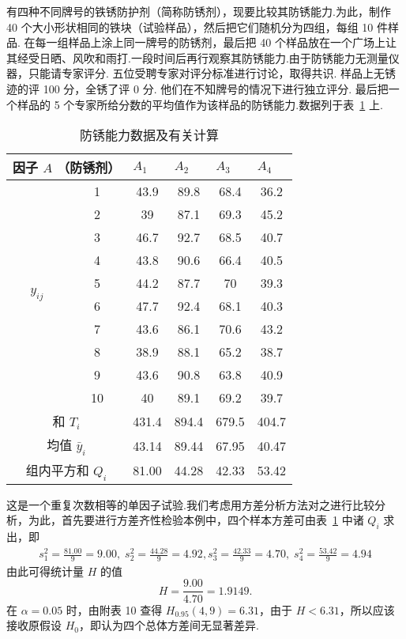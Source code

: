 \begin{example}
  有四种不同牌号的铁锈防护剂（简称防锈剂），现要比较其防锈能力.为此，制作 40 个大小形状相同的铁块（试验样品），然后把它们随机分为四组，每组 10 件样品. 在每一组样品上涂上同一牌号的防锈剂，最后把 40 个样品放在一个广场上让其经受日晒、风吹和雨打.一段时间后再行观察其防锈能力.由于防锈能力无测量仪器，只能请专家评分. 五位受聘专家对评分标准进行讨论，取得共识. 样品上无锈迹的评 100 分，全锈了评 0 分. 他们在不知牌号的情况下进行独立评分. 最后把一个样品的 5 个专家所给分数的平均值作为该样品的防锈能力.数据列于表~\ref{tab:8.3.1} 上.
\begin{table}[htbp]
  \centering
  \caption{防锈能力数据及有关计算}
    \begin{tabular}{c|c|cccc}
    \toprule
    \multicolumn{2}{c|}{因子 $A$ （防锈剂）} & \multicolumn{1}{l}{$A_1$} & \multicolumn{1}{l}{$A_2$} & \multicolumn{1}{l}{$A_3$} & \multicolumn{1}{l}{$A_4$} \\
    \midrule
    \multirow{10}[2]{*}{$y_{ij}$} &1 & 43.9  & 89.8  & 68.4  & 36.2 \\
          & 2 & 39    & 87.1  & 69.3  & 45.2 \\
          & 3 & 46.7  & 92.7  & 68.5  & 40.7 \\
          & 4 & 43.8  & 90.6  & 66.4  & 40.5 \\
          & 5 & 44.2  & 87.7  & 70    & 39.3 \\
          & 6 & 47.7  & 92.4  & 68.1  & 40.3 \\
          & 7 & 43.6  & 86.1  & 70.6  & 43.2 \\
          & 8 & 38.9  & 88.1  & 65.2  & 38.7 \\
          & 9 & 43.6  & 90.8  & 63.8  & 40.9 \\
          & 10 & 40    & 89.1  & 69.2  & 39.7 \\
    \midrule
    \multicolumn{2}{c|}{和 $T_i$} & 431.4 & 894.4 & 679.5 & 404.7 \\
    \multicolumn{2}{c|}{均值 $\bar{y}_i$} & 43.14 & 89.44 & 67.95 & 40.47 \\
    \multicolumn{2}{c|}{组内平方和 $Q_i$} & 81.00    & 44.28 & 42.33 & 53.42 \\
    \bottomrule
    \end{tabular}%
  \label{tab:8.3.1}%
\end{table}%
这是一个重复次数相等的单因子试验.我们考虑用方差分析方法对之进行比较分析，为此，首先要进行方差齐性检验本例中，四个样本方差可由表~\ref{tab:8.3.1} 中诸 $Q_i$ 求出，即
\begin{align*}
  s_1^2 = \frac{81.00}{9} = 9.00, \; s_2^2 = \frac{44.28}{9} = 4.92,
  s_3^2 = \frac{42.33}{9} = 4.70, \; s_4^2 = \frac{53.42}{9} = 4.94
\end{align*}
由此可得统计量 $H$ 的值
\begin{equation*}
  H = \frac{9.00}{4.70} = 1.9149.
\end{equation*}
在 $\alpha=0.05$ 时，由附表 10 查得 $H_{0.95}(4,9)=6.31$，由于 $H<6.31$，所以应该接收原假设 $H_0$，即认为四个总体方差间无显著差异.


\end{example}
